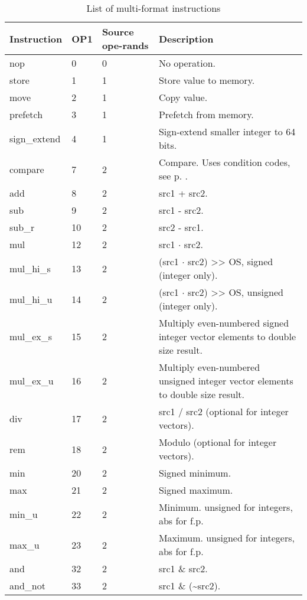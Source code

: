 \documentclass[forwardcom.tex]{subfiles}
\begin{document}
\begin{longtable} {|p{18mm}|p{9mm}|p{9mm}|p{76mm}|}
\caption{
List of multi-format instructions} 
\label{table:ListOfMultiFormatInstructions} \\
\endfirsthead
\endhead
\hline
\bfseries Instruction & \bfseries OP1 & \bfseries Source ope-rands & \bfseries Description \\
\hline
nop          &  0 & 0 & No operation. \\
store        &  1 & 1 & Store value to memory. \\
move         &  2 & 1 & Copy value. \\
prefetch     &  3 & 1 & Prefetch from memory. \\
sign\_extend &  4 & 1 & Sign-extend smaller integer to 64 bits. \\
compare      &  7 & 2 & Compare. Uses condition codes, see p. \pageref{table:conditionCodesForCompareInstruction}. \\
add          &  8 & 2 & src1 + src2. \\
sub          &  9 & 2 & src1 - src2. \\
sub\_r       & 10 & 2 & src2 - src1. \\
mul          & 12 & 2 & src1 $\cdot$ src2. \\ 
mul\_hi\_s   & 13 & 2 & (src1 $\cdot$ src2) \textgreater\textgreater{} OS, signed (integer only). \\
mul\_hi\_u   & 14 & 2 & (src1 $\cdot$ src2) \textgreater\textgreater{}  OS, unsigned (integer only). \\
mul\_ex\_s   & 15 & 2 & Multiply even-numbered signed integer vector elements to double size result. \\
mul\_ex\_u   & 16 & 2 & Multiply even-numbered unsigned integer vector elements to double size result. \\
div          & 17 & 2 & src1 / src2 (optional for integer vectors). \\
rem          & 18 & 2 & Modulo (optional for integer vectors). \\
min          & 20 & 2 & Signed minimum. \\
max          & 21 & 2 & Signed maximum. \\
min\_u       & 22 & 2 & Minimum. unsigned for integers, abs for f.p. \\
max\_u       & 23 & 2 & Maximum. unsigned for integers, abs for f.p. \\
and          & 32 & 2 & src1 \& src2. \\
and\_not     & 33 & 2 & src1 \& (\~{}src2). \\

\end{longtable}
\end{document}
